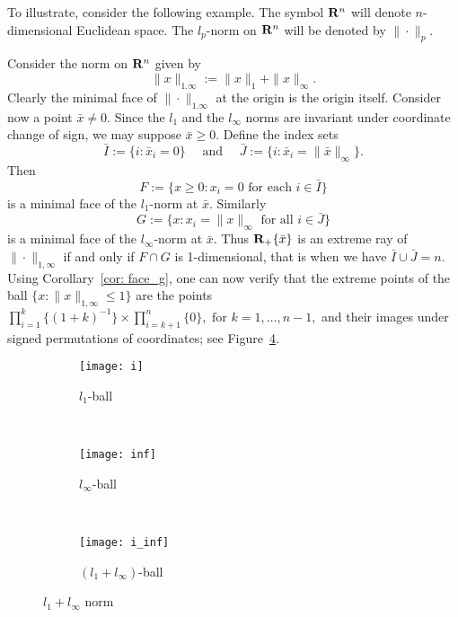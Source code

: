 \documentclass[smallextended,numbook]{svjour3}
\begin{document}
\smallskip
To illustrate, consider the following example. The symbol ${{\bf R}}^n$ will denote $n$-dimensional Euclidean space. The $l_p$-norm on ${{\bf R}}^n$ will be denoted by $\|\cdot \|_p$. 
\begin{exa}
{\rm
Consider the norm on ${{\bf R}}^n$ given by 
$$\|x\|_{1.\infty}:=\|x\|_1+\|x\|_{\infty}.$$ 
Clearly the minimal face of $\|\cdot \|_{1.\infty}$ at the origin is the origin itself. Consider now a point $\bar{x}\neq 0$. Since the $l_1$ and the $l_{\infty}$ norms are invariant under coordinate change of sign, we may suppose $\bar{x}\geq 0$. 
Define the index sets
$$\bar{I}:=\{i: \bar{x}_i=0\} \quad\textrm{ and } \quad \bar{J}:=\{i: \bar{x}_i=\|\bar{x}\|_{\infty}\}.$$ 
Then $$F:=\{x\geq 0: x_i=0 \textrm{ for each } i\in \bar{I}\}$$
is a minimal face of the $l_1$-norm at $\bar{x}$. Similarly
$$G:= \{x: x_i=\|x\|_{\infty} \textrm{ for all } i\in\bar{J} \}$$ is a minimal face of the $l_{\infty}$-norm at $\bar{x}$.
Thus ${{\bf R}}_{+}\{\bar{x}\}$ is an extreme ray of $\|\cdot\|_{1,\infty}$ if and only if $F\cap G$ is 1-dimensional, that is when we have $\bar{I}\cup \bar{J}=n$.  Using Corollary~\ref{cor: face_g}, one can now verify that the extreme points of the ball $\{x:\|x\|_{1,\infty} \leq 1\}$ are the points
$\prod^{k}_{i=1} \{(1+k)^{-1}\} \times \prod^n_{i=k+1} \{0\}, \textrm{ for } k=1,\ldots,n-1,$
and their images under signed permutations of coordinates; see Figure~\ref{fig:vec_norms}. 
\vspace{-10pt}
\begin{figure}[h]
        \centering
        \begin{subfigure}[b]{0.3\textwidth}
                \centering
                \texttt{[image: i]}
                \caption{$l_1$-ball}
                \label{fig:gull}
        \end{subfigure}        ~ 
          
        \begin{subfigure}[b]{0.3\textwidth}
                \centering
                \texttt{[image: inf]}
                \caption{$l_{\infty}$-ball}
                \label{fig:tiger}
        \end{subfigure}
        ~ 
          
        \begin{subfigure}[b]{0.3\textwidth}
                \centering
                \texttt{[image: i\_inf]}
                \caption{$(l_1+l_{\infty})$-ball}
                \label{fig:mouse}
        \end{subfigure}
       \caption{$l_1+l_{\infty}$ norm}
        \label{fig:vec_norms}
\end{figure}

}
\end{exa}
\end{document}
